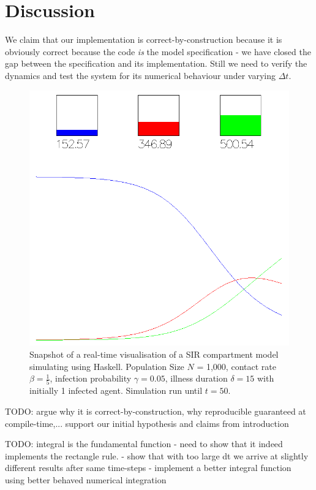 \section{Discussion}
We claim that our implementation is correct-by-construction because it is obviously correct because the code \textit{is} the model specification - we have closed the gap between the specification and its implementation. Still we need to verify the dynamics and test the system for its numerical behaviour under varying $\Delta t$.

\begin{figure}
	\centering
	\includegraphics[width=.4\textwidth, angle=0]{./fig/visualisation_t50.png}
	\caption{Snapshot of a real-time visualisation of a SIR compartment model simulating using Haskell. Population Size $N$ = 1,000, contact rate $\beta =  \frac{1}{5}$, infection probability $\gamma = 0.05$, illness duration $\delta = 15$ with initially 1 infected agent. Simulation run until $t = 50$.}
	\label{fig:sir_sd_visualisation}
\end{figure}

TODO: argue why it is correct-by-construction, why reproducible guaranteed at compile-time,... support our initial hypothesis and claims from introduction

TODO: integral is the fundamental function
- need to show that it indeed implements the rectangle rule. 
- show that with too large dt we arrive at slightly different results after same time-steps
- implement a better integral function using better behaved numerical integration